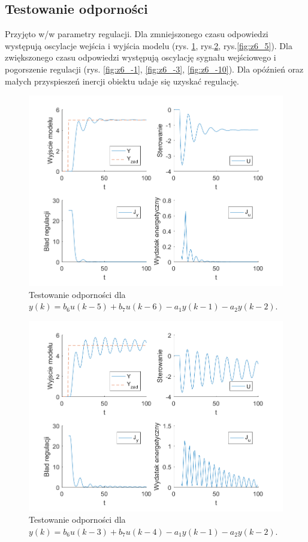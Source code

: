 \documentclass[a4paper, 10pt]{article}
\begin{document}
	\subsection{Testowanie odporności}
	Przyjęto w/w parametry regulacji. Dla zmniejszonego czasu odpowiedzi występują oscylacje wejścia i wyjścia modelu (rys. \ref{fig:z6_1}, rys.\ref{fig:z6_3}, rys.\ref{fig:z6_5}). Dla zwiększonego czasu odpowiedzi występują oscylację sygnału wejściowego i pogorszenie regulacji (rys. \ref{fig:z6_-1}, \ref{fig:z6_-3}, \ref{fig:z6_-10}). Dla opóźnień oraz małych przyspieszeń inercji obiektu udaje się uzyskać regulację.
	\begin{figure}[H]
	\centering
	\includegraphics[width=0.9\linewidth]{z6_1}
	\caption{Testowanie odporności dla  $y(k) = b_6u(k-5)+b_7u(k-6)-a_1y(k-1)-a_2y(k-2)$.}
	\label{fig:z6_1}
	\end{figure}
	
	\begin{figure}[H]
		\centering
		\includegraphics[width=0.9\linewidth]{z6_3}
		\caption{Testowanie odporności dla  $y(k) = b_6u(k-3)+b_7u(k-4)-a_1y(k-1)-a_2y(k-2)$.}
		\label{fig:z6_3}
		\end{figure}
		
\end{document}
